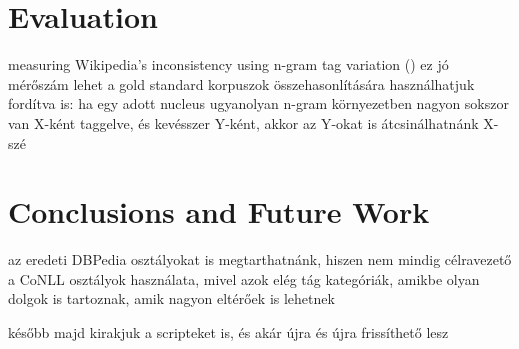 \documentclass[11pt]{article}
\begin{document}
\section{Evaluation}


measuring Wikipedia's inconsistency using n-gram tag variation (\cite{Nothman:09})
ez jó mérőszám lehet a gold standard korpuszok összehasonlítására
használhatjuk fordítva is: ha egy adott nucleus ugyanolyan n-gram környezetben nagyon sokszor van X-ként taggelve, és kevésszer Y-ként, akkor az Y-okat is átcsinálhatnánk X-szé


\section{Conclusions and Future Work}

az eredeti DBPedia osztályokat is megtarthatnánk, hiszen nem mindig célravezető a CoNLL osztályok használata, mivel azok elég tág kategóriák, amikbe olyan dolgok is tartoznak, amik nagyon eltérőek is lehetnek

később majd kirakjuk a scripteket is, és akár újra és újra frissíthető lesz


\end{document}
